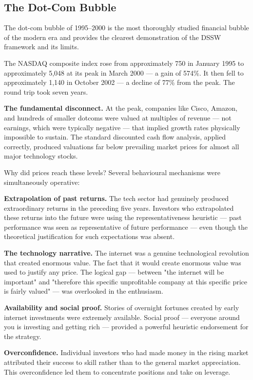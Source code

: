 \documentclass[12pt, letterpaper]{article}
\begin{document}
\subsection{The Dot-Com Bubble}


The dot-com bubble of 1995--2000 is the most thoroughly studied financial bubble of the modern era and provides the clearest demonstration of the DSSW framework and its limits.

The NASDAQ composite index rose from approximately 750 in January 1995 to approximately 5,048 at its peak in March 2000 --- a gain of 574\%. It then fell to approximately 1,140 in October 2002 --- a decline of 77\% from the peak. The round trip took seven years.

\textbf{The fundamental disconnect.} At the peak, companies like Cisco, Amazon, and hundreds of smaller dotcoms were valued at multiples of revenue --- not earnings, which were typically negative --- that implied growth rates physically impossible to sustain. The standard discounted cash flow analysis, applied correctly, produced valuations far below prevailing market prices for almost all major technology stocks.

Why did prices reach these levels? Several behavioural mechanisms were simultaneously operative:

\textbf{Extrapolation of past returns.} The tech sector had genuinely produced extraordinary returns in the preceding five years. Investors who extrapolated these returns into the future were using the representativeness heuristic --- past performance was seen as representative of future performance --- even though the theoretical justification for such expectations was absent.

\textbf{The technology narrative.} The internet was a genuine technological revolution that created enormous value. The fact that it would create enormous value was used to justify any price. The logical gap --- between "the internet will be important" and "therefore this specific unprofitable company at this specific price is fairly valued" --- was overlooked in the enthusiasm.

\textbf{Availability and social proof.} Stories of overnight fortunes created by early internet investments were extremely available. Social proof --- everyone around you is investing and getting rich --- provided a powerful heuristic endorsement for the strategy.

\textbf{Overconfidence.} Individual investors who had made money in the rising market attributed their success to skill rather than to the general market appreciation. This overconfidence led them to concentrate positions and take on leverage.
\end{document}
